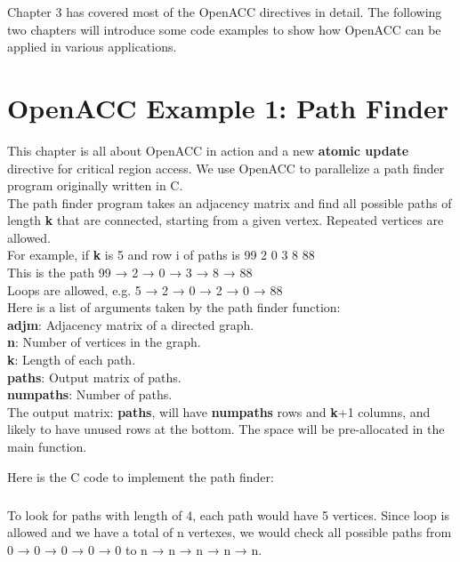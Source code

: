 \documentclass[ebook,10pt,oneside,openany]{memoir}
\begin{document}
Chapter 3 has covered most of the OpenACC directives in detail. The following two chapters will introduce some code examples to show how OpenACC can be applied in various applications.

\chapter{OpenACC Example 1: Path Finder}

This chapter is all about OpenACC in action and a new \textbf{atomic update} directive for critical region access. We use OpenACC to parallelize a path finder program originally written in C. \\

The path finder program takes an adjacency matrix and find all possible paths of length \textbf{k} that are connected, starting from a given vertex. Repeated vertices are allowed.  \\

For example, if \textbf{k} is 5 and row i of paths is 99 2 0 3 8 88 \\
This is the path 99 → 2 → 0 → 3 → 8 → 88 \\
Loops are allowed, e.g. 5 → 2 → 0 → 2 → 0 → 88 \\

Here is a list of arguments taken by the path finder function: \\
\textbf{adjm}: Adjacency matrix of a directed graph.\\
\textbf{n}: Number of vertices in the graph.\\
\textbf{k}: Length of each path.\\
\textbf{paths}: Output matrix of paths.\\
\textbf{numpaths}: Number of paths.\\

The output matrix: \textbf{paths}, will have \textbf{numpaths} rows and \textbf{k}+1 columns, and likely to have unused rows at the bottom. The space will be pre-allocated in the main function.



Here is the C code to implement the path finder:

\paragraph{}
To look for paths with length of 4, each path would have 5 vertices. Since loop is allowed and we have a total of n vertexes, we would check all possible paths from 0 → 0 → 0 → 0 → 0 to n → n → n → n → n. \\
\end{document}
